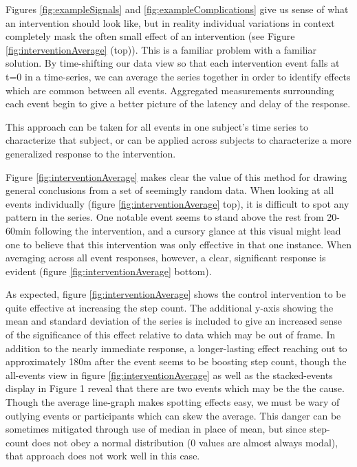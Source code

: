 \documentclass[review,journal]{vgtc}         %
\begin{document}
Figures \ref{fig:exampleSignals} and \ref{fig:exampleComplications} give us sense of what an intervention should look like, but in reality individual variations in context completely mask the often small effect of an intervention (see Figure \ref{fig:interventionAverage} (top)).
This is a familiar problem with a familiar solution.
By time-shifting our data view so that each intervention event falls at t=0 in a time-series, we can average the series together in order to identify effects which are common between all events.
Aggregated measurements surrounding each event begin to give a better picture of the latency and delay of the response.

This approach can be taken for all events in one subject's time series to characterize that subject, or can be applied across subjects to characterize a more generalized response to the intervention.

Figure \ref{fig:interventionAverage} makes clear the value of this method for drawing general conclusions from a set of seemingly random data.
When looking at all events individually (figure \ref{fig:interventionAverage} top), it is difficult to spot any pattern in the series.
One notable event seems to stand above the rest from 20-60min following the intervention, and a cursory glance at this visual might lead one to believe that this intervention was only effective in that one instance.
When averaging across all event responses, however, a clear, significant response is evident (figure \ref{fig:interventionAverage} bottom).

As expected, figure \ref{fig:interventionAverage} shows the control intervention to be quite effective at increasing the step count.
The additional y-axis showing the mean and standard deviation of the series is included to give an increased sense of the significance of this effect relative to data which may be out of frame.
In addition to the nearly immediate response, a longer-lasting effect reaching out to approximately 180m after the event seems to be boosting step count, though the all-events view in figure \ref{fig:interventionAverage} as well as the stacked-events display in Figure 1 reveal that there are two events which may be the the cause.
Though the average line-graph makes spotting effects easy, we must be wary of outlying events or participants which can skew the average.
This danger can be sometimes mitigated through use of median in place of mean, but since step-count does not obey a normal distribution (0 values are almost always modal), that approach does not work well in this case.
\end{document}
